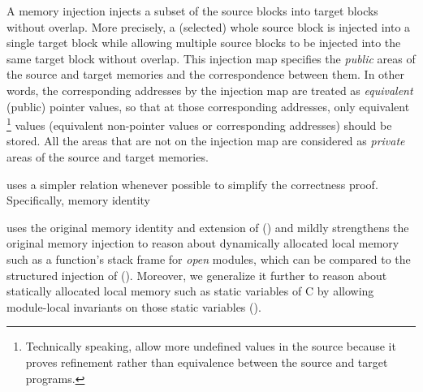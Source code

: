 {%
A memory injection injects a subset of the source blocks into target blocks
without overlap. More precisely, a (selected) whole source block is injected into a single target block
while allowing multiple source blocks to be injected into the same target block without overlap.
This injection map specifies the \emph{public} areas of the source and target memories and the correspondence between them.
In other words, the corresponding addresses by the injection map are treated as \emph{equivalent} (public) pointer values,
so that at those corresponding addresses,
only equivalent%
\footnote{Technically speaking, \cc{} allow more undefined values in the source
  because it proves refinement rather than equivalence between the source and target programs.}
values (\ie equivalent non-pointer values or corresponding addresses) should be stored.
All the areas that are not on the injection map are considered as \emph{private} areas of the source and target memories.

\cc{} uses a simpler relation whenever possible to simplify the correctness proof.
Specifically, memory identity
}

\label{sec:overview-verification:injection}


\ccm{} uses the original memory identity and extension of \cc{}
() and mildly
strengthens the original memory injection to reason about dynamically allocated
local memory such as a function's stack frame for \emph{open} modules,
which can be compared to the structured injection of \ccc{}
().
Moreover, we generalize it further to reason about statically allocated local memory
such as static variables of C by allowing module-local invariants on those static variables
().







